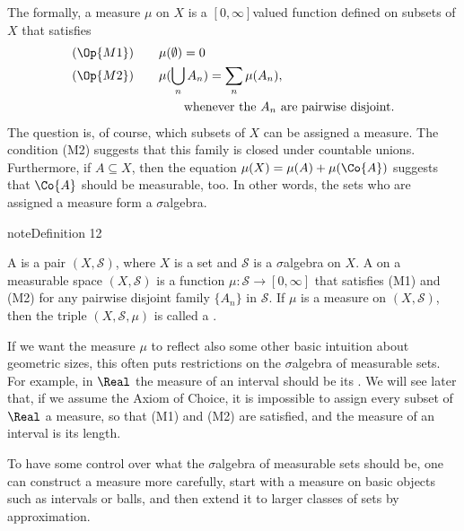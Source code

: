 \documentclass[letterpaper,10pt,english]{jupyterBook}
\begin{document}
\sphinxAtStartPar
The formally, a measure \(\mu\) on \(X\) is a \([0,\infty]\)\sphinxhyphen{}valued function defined on subsets of \(X\) that satisfies
\begin{align*}
    (\Op{M1}) & \qquad \mu(\emptyset) = 0 \\
    (\Op{M2}) & \qquad \mu(\bigcup_n A_n) = \sum_n \mu(A_n), \\
              & \qquad \qquad \text{whenever the $A_n$ are pairwise disjoint.}
\end{align*}
\sphinxAtStartPar
The question is, of course, which subsets of \(X\) can be assigned a measure. The condition (M2) suggests that this family is closed under countable unions. Furthermore, if \(A \subseteq X\), then the equation \(\mu(X) = \mu(A) + \mu(\Co{A})\) suggests that \(\Co{A}\) should be measurable, too. In other words, the sets who are assigned a measure form a \(\sigma\)\sphinxhyphen{}algebra.
\label{measure:def-measure}
\begin{sphinxadmonition}{note}{Definition 12}



\sphinxAtStartPar
A  is a pair \((X, \mathcal{S})\), where \(X\) is a set and \(\mathcal{S}\) is a \(\sigma\)\sphinxhyphen{}algebra on \(X\). A  on a measurable space \((X, \mathcal{S})\) is a function \(\mu: \mathcal{S} \to [0,\infty]\) that satisfies (M1) and (M2) for any pairwise disjoint family \(\{A_n\}\) in \(\mathcal{S}\). If \(\mu\) is a measure on \((X, \mathcal{S})\), then the triple \((X,\mathcal{S}, \mu)\) is called a .
\end{sphinxadmonition}

\sphinxAtStartPar
If we want the measure \(\mu\) to reflect also some other basic intuition about geometric sizes, this often puts restrictions on the \(\sigma\)\sphinxhyphen{}algebra of measurable sets. For example, in \(\Real\) the measure of an interval should be its . We will see later that, if we assume the Axiom of Choice, it is impossible to assign every subset of \(\Real\) a measure, so that (M1) and (M2) are satisfied, and the measure of an interval is its length.

\sphinxAtStartPar
To have some control over what the \(\sigma\)\sphinxhyphen{}algebra of measurable sets should be, one can construct a measure more carefully, start with a measure on basic objects such as intervals or balls, and then extend it to larger classes of sets by approximation.
\end{document}
